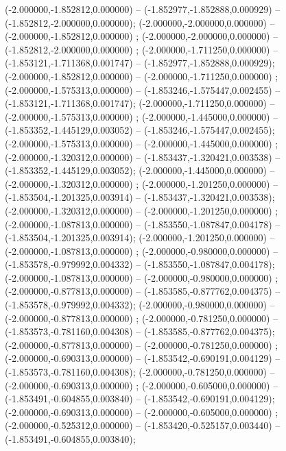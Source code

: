  (-2.000000,-1.852812,0.000000) -- (-1.852977,-1.852888,0.000929) -- (-1.852812,-2.000000,0.000000);
 (-2.000000,-2.000000,0.000000) -- (-2.000000,-1.852812,0.000000) ;
 (-2.000000,-2.000000,0.000000) -- (-1.852812,-2.000000,0.000000) ;
 (-2.000000,-1.711250,0.000000) -- (-1.853121,-1.711368,0.001747) -- (-1.852977,-1.852888,0.000929);
 (-2.000000,-1.852812,0.000000) -- (-2.000000,-1.711250,0.000000) ;
 (-2.000000,-1.575313,0.000000) -- (-1.853246,-1.575447,0.002455) -- (-1.853121,-1.711368,0.001747);
 (-2.000000,-1.711250,0.000000) -- (-2.000000,-1.575313,0.000000) ;
 (-2.000000,-1.445000,0.000000) -- (-1.853352,-1.445129,0.003052) -- (-1.853246,-1.575447,0.002455);
 (-2.000000,-1.575313,0.000000) -- (-2.000000,-1.445000,0.000000) ;
 (-2.000000,-1.320312,0.000000) -- (-1.853437,-1.320421,0.003538) -- (-1.853352,-1.445129,0.003052);
 (-2.000000,-1.445000,0.000000) -- (-2.000000,-1.320312,0.000000) ;
 (-2.000000,-1.201250,0.000000) -- (-1.853504,-1.201325,0.003914) -- (-1.853437,-1.320421,0.003538);
 (-2.000000,-1.320312,0.000000) -- (-2.000000,-1.201250,0.000000) ;
 (-2.000000,-1.087813,0.000000) -- (-1.853550,-1.087847,0.004178) -- (-1.853504,-1.201325,0.003914);
 (-2.000000,-1.201250,0.000000) -- (-2.000000,-1.087813,0.000000) ;
 (-2.000000,-0.980000,0.000000) -- (-1.853578,-0.979992,0.004332) -- (-1.853550,-1.087847,0.004178);
 (-2.000000,-1.087813,0.000000) -- (-2.000000,-0.980000,0.000000) ;
 (-2.000000,-0.877813,0.000000) -- (-1.853585,-0.877762,0.004375) -- (-1.853578,-0.979992,0.004332);
 (-2.000000,-0.980000,0.000000) -- (-2.000000,-0.877813,0.000000) ;
 (-2.000000,-0.781250,0.000000) -- (-1.853573,-0.781160,0.004308) -- (-1.853585,-0.877762,0.004375);
 (-2.000000,-0.877813,0.000000) -- (-2.000000,-0.781250,0.000000) ;
 (-2.000000,-0.690313,0.000000) -- (-1.853542,-0.690191,0.004129) -- (-1.853573,-0.781160,0.004308);
 (-2.000000,-0.781250,0.000000) -- (-2.000000,-0.690313,0.000000) ;
 (-2.000000,-0.605000,0.000000) -- (-1.853491,-0.604855,0.003840) -- (-1.853542,-0.690191,0.004129);
 (-2.000000,-0.690313,0.000000) -- (-2.000000,-0.605000,0.000000) ;
 (-2.000000,-0.525312,0.000000) -- (-1.853420,-0.525157,0.003440) -- (-1.853491,-0.604855,0.003840);
